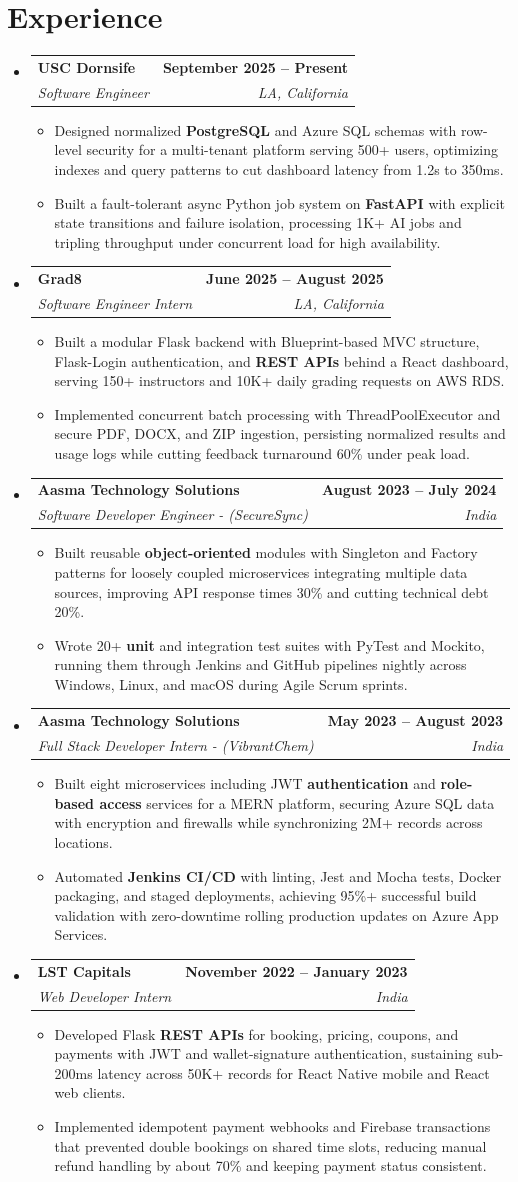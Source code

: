 \documentclass[letterpaper,10pt]{article}
\makeatletter
\newcommand{\itemTail}{\vspace{-4pt}}
\newcommand{\sectionGap}{\vspace{-8pt}}
\newcommand{\roleGap}{\vspace{2pt}}
\newcommand{\resumeItem}[1]{\item\small{{#1 \itemTail}}}
\newcommand{\resumeSubheading}[4]{\vspace{-1pt}\item\begin{tabular*}{1.0\textwidth}[t]{l@{\extracolsep{\fill}}r}\textbf{#1} & \textbf{\small #2} \\\textit{\small#3} & \textit{\small #4} \\\end{tabular*}\vspace{-2pt}}
\newcommand{\resumeSubHeadingListStart}{\begin{itemize}[leftmargin=0.0in, label={}]}
\newcommand{\resumeSubHeadingListEnd}{\end{itemize}}
\newcommand{\resumeItemListStart}{\begin{itemize}[leftmargin=0.15in,label=\textbullet,itemsep=3pt,topsep=0pt,parsep=0pt,partopsep=0pt]}
\newcommand{\resumeItemListEnd}{\end{itemize}\vspace{-4pt}}
\makeatother
\begin{document}
\section{Experience}
\resumeSubHeadingListStart
\resumeSubheading{USC Dornsife}{September 2025 -- Present}{Software Engineer}{LA, California}
\resumeItemListStart
\resumeItem{Designed normalized \textbf{PostgreSQL} and Azure SQL schemas with row-level security for a multi-tenant platform serving 500+ users, optimizing indexes and query patterns to cut dashboard latency from 1.2s to 350ms.}
\resumeItem{Built a fault-tolerant async Python job system on \textbf{FastAPI} with explicit state transitions and failure isolation, processing 1K+ AI jobs and tripling throughput under concurrent load for high availability.}
\resumeItemListEnd
\roleGap
\resumeSubheading{Grad8}{June 2025 -- August 2025}{Software Engineer Intern}{LA, California}
\resumeItemListStart
\resumeItem{Built a modular Flask backend with Blueprint-based MVC structure, Flask-Login authentication, and \textbf{REST APIs} behind a React dashboard, serving 150+ instructors and 10K+ daily grading requests on AWS RDS.}
\resumeItem{Implemented concurrent batch processing with ThreadPoolExecutor and secure PDF, DOCX, and ZIP ingestion, persisting normalized results and usage logs while cutting feedback turnaround 60\% under peak load.}
\resumeItemListEnd
\roleGap
\resumeSubheading{Aasma Technology Solutions}{August 2023 -- July 2024}{Software Developer Engineer - (SecureSync)}{India}
\resumeItemListStart
\resumeItem{Built reusable \textbf{object-oriented} modules with Singleton and Factory patterns for loosely coupled microservices integrating multiple data sources, improving API response times 30\% and cutting technical debt 20\%.}
\resumeItem{Wrote 20+ \textbf{unit} and integration test suites with PyTest and Mockito, running them through Jenkins and GitHub pipelines nightly across Windows, Linux, and macOS during Agile Scrum sprints.}
\resumeItemListEnd
\roleGap
\resumeSubheading{Aasma Technology Solutions}{May 2023 -- August 2023}{Full Stack Developer Intern - (VibrantChem)}{India}
\resumeItemListStart
\resumeItem{Built eight microservices including JWT \textbf{authentication} and \textbf{role-based access} services for a MERN platform, securing Azure SQL data with encryption and firewalls while synchronizing 2M+ records across locations.}
\resumeItem{Automated \textbf{Jenkins CI/CD} with linting, Jest and Mocha tests, Docker packaging, and staged deployments, achieving 95\%+ successful build validation with zero-downtime rolling production updates on Azure App Services.}
\resumeItemListEnd
\roleGap
\resumeSubheading{LST Capitals}{November 2022 -- January 2023}{Web Developer Intern}{India}
\resumeItemListStart
\resumeItem{Developed Flask \textbf{REST APIs} for booking, pricing, coupons, and payments with JWT and wallet-signature authentication, sustaining sub-200ms latency across 50K+ records for React Native mobile and React web clients.}
\resumeItem{Implemented idempotent payment webhooks and Firebase transactions that prevented double bookings on shared time slots, reducing manual refund handling by about 70\% and keeping payment status consistent.}
\resumeItemListEnd
\resumeSubHeadingListEnd
\sectionGap
\end{document}
